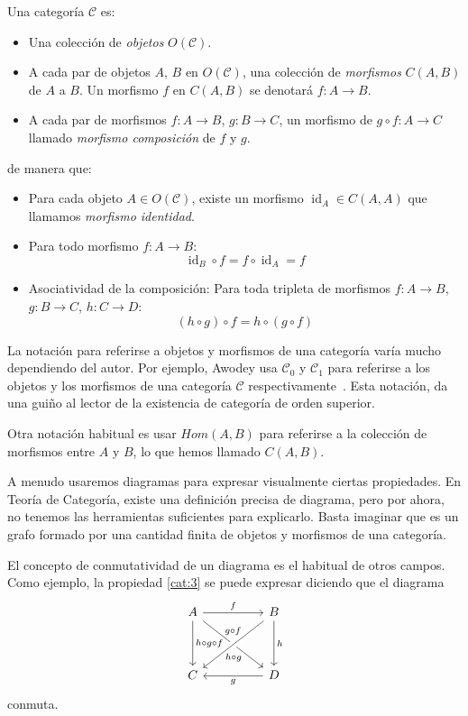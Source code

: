\documentclass[12pt, twoside]{book}
\newcommand{\cat}{{\mathcal{C}}}
\DeclareMathOperator{\id}{id}
\begin{document}
\begin{definition}
Una categoría $\cat$ es:
\begin{itemize}
\item Una colección de \emph{objetos} $O(\cat)$.
\item A cada par de objetos $A$, $B$ en $O(\cat)$, una colección de \emph{morfismos} $C(A,B)$ de $A$ a $B$.
Un morfismo $f$ en $C(A,B)$ se denotará $f \colon A \to B$.
\item A cada par de morfismos $f \colon A \to B$, $g \colon B \to C$, un morfismo de $g \circ f \colon A \to C$ llamado \emph{morfismo composición} de $f$ y $g$.
\end{itemize}
de manera que:
\begin{itemize}
\item Para cada objeto $A \in O(\cat)$, existe un morfismo $\id_A \in C(A,A)$ que llamamos \emph{morfismo identidad}.
\item Para todo morfismo $f \colon A \to B$:
\[ \id_B \circ f = f \circ \id_A = f \]
\item Asociatividad de la composición: Para toda tripleta de morfismos $f \colon A \to B$, $g \colon B \to C$, $h \colon C \to D$:
\begin{equation}\label{cat:3} (h \circ g) \circ f = h \circ (g \circ f) \end{equation}
\end{itemize}
\end{definition}

La notación para referirse a objetos y morfismos de una categoría varía mucho dependiendo del autor.
Por ejemplo, Awodey usa $\cat_0$ y $\cat_1$ para referirse a los objetos y los morfismos de una categoría $\cat$ respectivamente~\cite{awodey}.
Esta notación, da una guiño al lector de la existencia de categoría de orden superior.

Otra notación habitual es usar $Hom(A,B)$ para referirse a la colección de morfismos entre $A$ y $B$, lo que hemos llamado $C(A,B)$.

A menudo usaremos diagramas para expresar visualmente ciertas propiedades.
En Teoría de Categoría, existe una definición precisa de diagrama, pero por ahora, no tenemos las herramientas suficientes para explicarlo.
Basta imaginar que es un grafo formado por una cantidad finita de objetos y morfismos de una categoría.

El concepto de conmutatividad de un diagrama es el habitual de otros campos.
Como ejemplo, la propiedad \eqref{cat:3} se puede expresar diciendo que el diagrama
\[
\begin{tikzcd}
A \arrow[rr,"f"]\arrow[rrdd,"g \circ f" above=5pt] \arrow[dd,"h\circ g \circ f"] & & B \arrow[lldd,"h\circ g" below=5pt, crossing over] \arrow[dd,"h"]\\
&\\
C & & D \arrow[ll,"g"]
\end{tikzcd}
\]
conmuta.
\end{document}
